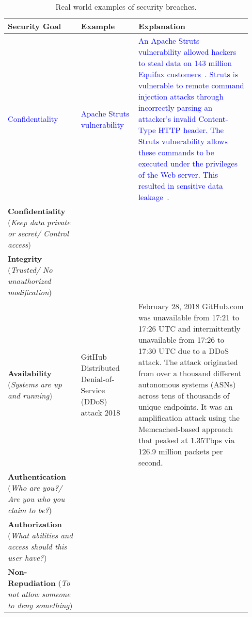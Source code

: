 \documentclass[11pt,letterpaper]{article}
\begin{document}
\begin{table}[htbp]
    \caption{Real-world examples of security breaches.
    }
    \begin{tabularx}{\columnwidth}{|p{3.4cm}|p{3.4cm}|X|}
        \hline
        \textbf{Security Goal} & \textbf{Example} & \textbf{Explanation}  \\
        
        \hline
        \textcolor{blue}{Confidentiality} & 
        \textcolor{blue}{Apache Struts vulnerability} & 
        \textcolor{blue}{An Apache Struts vulnerability allowed hackers to steal data on 143 million Equifax customers~\cite{luszcz2018apache}. Struts is vulnerable to remote command injection attacks through incorrectly parsing an attacker’s invalid Content-Type HTTP header. The Struts vulnerability allows these commands to be executed under the privileges of the Web server. This resulted in sensitive data leakage~\cite{apachestruts}.}
        \\ \hline
        
        \hline
        \textbf{Confidentiality} (\textit{Keep data private or secret/ Control access}) & 
        &
        \\ \hline
        
        \hline
        \textbf{Integrity} (\textit{Trusted/ No unauthorized modification}) & 
        &
        \\ \hline
        
        \hline
        \textbf{Availability} (\textit{Systems are up and running}) &
        GitHub Distributed Denial-of-Service (DDoS) attack 2018 &
        February 28, 2018 GitHub.com was unavailable from 17:21 to 17:26 UTC and intermittently unavailable from 17:26 to 17:30 UTC due to a DDoS attack. The attack originated from over a thousand different autonomous systems (ASNs) across tens of thousands of unique endpoints. It was an amplification attack using the Memcached-based approach that peaked at 1.35Tbps via 126.9 million packets per second.
        \\ \hline
        
        \hline
        \textbf{Authentication} (\textit{Who are you?/ Are you who you claim to be?}) & 
        &
        \\ \hline
        
        \hline
        \textbf{Authorization} (\textit{What abilities and access should this user have?}) & 
        &
        \\ \hline
        
        \hline
        \textbf{Non-Repudiation} (\textit{To not allow someone to deny something}) &
        &
        \\ \hline
        
        
    \end{tabularx}
\end{table}
\end{document}
